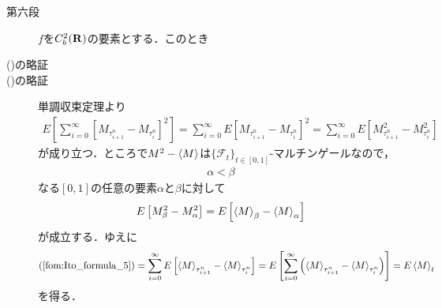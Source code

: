 \begin{sketch}
\begin{description}
			\item[第六段]
				$f$を$C^{2}_{b}(\mathbf{R})$の要素とする．このとき
				
			\item[()の略証]
				
				
			\item[()の略証]
				単調収束定理より
				\begin{align}
					E\left[\sum_{i=0}^{\infty} \left[M_{\tau^{n}_{i+1}} - M_{\tau^{n}_{i}}\right]^{2}\right]
					= \sum_{i=0}^{\infty} E\left[M_{\tau^{n}_{i+1}} - M_{\tau^{n}_{i}}\right]^{2}
					= \sum_{i=0}^{\infty} E\left[M_{\tau^{n}_{i+1}}^{2} - M_{\tau^{n}_{i}}^{2}\right]
					\label{fom:Ito_formula_5}
				\end{align}
				が成り立つ．ところで$M^{2} - \inprod<M>$は$\{\mathscr{F}_{t}\}_{t \in [0,1]}$-マルチンゲールなので，
				\begin{align}
					\alpha < \beta
				\end{align}
				なる$[0,1]$の任意の要素$\alpha$と$\beta$に対して
				\begin{align}
					E\left[M_{\beta}^{2} - M_{\alpha}^{2}\right]
					= E\left[\inprod<M>_{\beta} - \inprod<M>_{\alpha}\right]
				\end{align}
				が成立する．ゆえに
				\begin{align}
					(\refeq{fom:Ito_formula_5})
					= \sum_{i=0}^{\infty} E\left[\inprod<M>_{\tau^{n}_{i+1}} - \inprod<M>_{\tau^{n}_{i}}\right]
					= E\left[\sum_{i=0}^{\infty} \left(\inprod<M>_{\tau^{n}_{i+1}} - \inprod<M>_{\tau^{n}_{i}}\right) \right]
					= E\inprod<M>_{t}
				\end{align}
				を得る．
				

\end{description}
\end{sketch}
